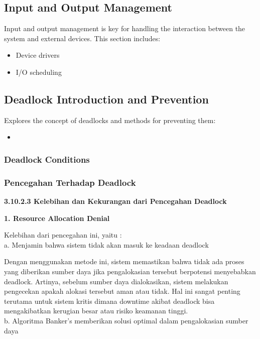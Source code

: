 \documentclass[12pt]{article}
\begin{document}
\subsection{Input and Output Management}
Input and output management is key for handling the interaction between the system and external devices. This section includes:
\begin{itemize}
    \item Device drivers
    \item I/O scheduling
\end{itemize}

\subsection{Deadlock Introduction and Prevention}

Explores the concept of deadlocks and methods for preventing them:
\begin{itemize}
    \item[]
\end{itemize}

\subsubsection{Deadlock Conditions}

\subsubsection{Pencegahan Terhadap Deadlock}
\textbf{3.10.2.3   Kelebihan dan Kekurangan dari Pencegahan Deadlock\\}

\textbf{1. Resource Allocation Denial\\}

    Kelebihan dari pencegahan ini, yaitu :\\

    a.	Menjamin bahwa sistem tidak akan masuk ke keadaan deadlock

    Dengan menggunakan metode ini, sistem memastikan bahwa tidak ada proses yang diberikan sumber daya jika pengalokasian tersebut berpotensi menyebabkan deadlock. Artinya, sebelum sumber daya dialokasikan, sistem melakukan pengecekan apakah alokasi tersebut aman atau tidak. Hal ini sangat penting terutama untuk sistem kritis dimana downtime akibat deadlock bisa mengakibatkan kerugian besar atau risiko keamanan tinggi.\\

    b.	Algoritma Banker's memberikan solusi optimal dalam pengalokasian sumber daya
    
\end{document}
